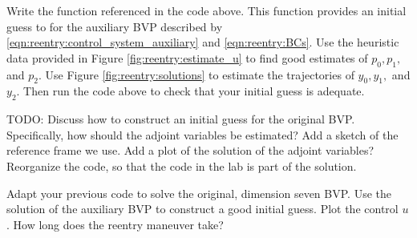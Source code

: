 \begin{problem}
	Write the function  referenced in the code above. 
	This function provides an initial guess to  for the auxiliary BVP described by  \eqref{eqn:reentry:control_system_auxiliary} and \eqref{eqn:reentry:BCs}.
	Use the heuristic data provided in Figure \ref{fig:reentry:estimate_u} to find good estimates of $p_0, p_1,$ and $p_2$. 
	Use Figure \ref{fig:reentry:solutions} to estimate the trajectories of $y_0, y_1,$ and $y_2$.
	Then run the code above to check that your initial guess is adequate. 
	\label{prob:reentry:guess}
\end{problem}


TODO: Discuss how to construct an initial guess for the original BVP.
 Specifically, how should the adjoint variables be estimated?
Add a sketch of the reference frame we use. 
Add a plot of the solution of the adjoint variables?
Reorganize the code, so that the code in the lab is part of the solution. 
\begin{problem}
	Adapt your previous code to solve the original, dimension seven BVP. 
	Use the solution of the auxiliary BVP to construct a good initial guess.
	Plot the control $u$. How long does the reentry maneuver take? 
\end{problem}

